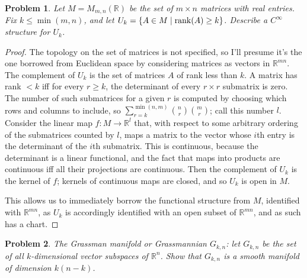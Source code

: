 \documentclass{article}
\newtheorem{plm}{Problem}
\begin{document}
\begin{plm}
  Let $M = M_{m,n}(\mathbb{R})$ be the set of $m \times n$ matrices with real entries.
  Fix $k \leq \min(m,  n)$, and let $U_{k} = \{A \in M \mid \rank(A) \geq k\}$.
  Describe a $C^{\infty}$ structure for $U_{k}$.
\end{plm}

\begin{proof}
  The topology on the set of matrices is not specified, so I'll presume it's the one borrowed from Euclidean space
  by considering matrices as vectors in $\mathbb{R}^{mn}$.
  The complement of $U_{k}$ is the set of matrices $A$ of rank less than $k$.
  A matrix has rank $< k$ iff for every $r \geq k$, the determinant of every $r \times r$ submatrix is zero.
  The number of such submatrices for a given $r$ is computed by choosing which rows and columns to include,
  so $\sum_{r = k}^{\min(n,m)}\binom{n}{r}\binom{m}{r}$; call this number $l$.
  Consider the linear map $f: M \to \mathbb{R}^{l}$ that, with respect to some arbitrary ordering of the submatrices counted by $l$,
  maps a matrix to the vector whose $i$th entry is the determinant of the $i$th submatrix.
  This is continuous, because the determinant is a linear functional,
  and the fact that maps into products are continuous iff all their projections are continuous.
  Then the complement of $U_{k}$ is the kernel of $f$; kernels of continuous maps are closed, and so $U_{k}$ is open in $M$.

  This allows us to immediately borrow the functional structure from $M$, identified with $\mathbb{R}^{mn}$,
  as $U_{k}$ is accordingly identified with an open subset of $\mathbb{R}^{mn}$, and as such has a chart.
\end{proof}

\begin{plm}
  The Grassman manifold or Grassmannian $G_{k,n}$: let $G_{k,n}$ be the set of all $k$-dimensional vector subspaces of $\mathbb{R}^{n}$.
  Show that $G_{k,n}$ is a smooth manifold of dimension $k(n - k)$.
\end{plm}
\end{document}
